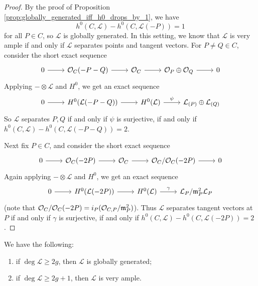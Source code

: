 \begin{proof}
  By the proof of Proposition
  \ref{prop:globally_generated_iff_h0_drops_by_1},
  we have
  \[
    h^0(C, \mathcal{L})
    - h^0(C, \mathcal{L}(-P))
    = 1
  \]
  for all $P \in C$, so
  $\mathcal{L}$ is globally generated.
  In this setting, we know that
  $\mathcal{L}$ is very ample if and only if
  $\mathcal{L}$ separates points and
  tangent vectors. For $P \ne Q \in C$,
  consider the short exact sequence
  \[
    \begin{tikzcd}
      0 \ar[r] & \OO_C(-P - Q)
      \ar[r] & \OO_C
      \ar[r] & \OO_P \oplus \OO_Q
      \ar[r] & 0
    \end{tikzcd}
  \]
  Applying $- \otimes \mathcal{L}$
  and $H^0$, we get an exact sequence
  \[
    \begin{tikzcd}
      0 \ar[r] & H^0(\mathcal{L}(-P - Q)) \ar[r] & H^0(\mathcal{L}) \ar[r, "\psi"]
               & \mathcal{L}_{(P)} \oplus \mathcal{L}_{(Q)}
    \end{tikzcd}
  \]
  So $\mathcal{L}$ separates $P, Q$ if and only
  if
  $\psi$ is surjective, if and only if
  $h^0(C, \mathcal{L})
    - h^0(C, \mathcal{L}(-P - Q)) = 2$.

  Next fix $P \in C$, and consider the
  short exact sequence
  \[
    \begin{tikzcd}
      0 \ar[r] & \OO_C(-2P)
      \ar[r] & \OO_C
      \ar[r] & \OO_C / \OO_C(-2P) \ar[r] & 0
    \end{tikzcd}
  \]
  Again applying
  $- \otimes \mathcal{L}$ and $H^0$, we
  get an exact sequence
  \[
    \begin{tikzcd}
      0 \ar[r] & H^0(\mathcal{L}(-2P))
      \ar[r] & H^0(\mathcal{L})
      \ar[r, "\gamma"] & \mathcal{L}_P / \m_P^2 \mathcal{L}_P
    \end{tikzcd}
  \]
  (note that
  $\mathcal{O}_C / \mathcal{O}_C(-2P) = i_P(\mathcal{O}_{C, P} / \mathfrak{m}_P^2)$).
  Thus $\mathcal{L}$ separates tangent
  vectors at $P$ if and only if
  $\gamma$ is surjective, if and only if
  $h^0(C, \mathcal{L})
    - h^0(C, \mathcal{L}(-2P)) = 2$.
\end{proof}

\begin{corollary}\label{cor:globally_generated_and_very_ample_if_degree_large_enough}
  We have the following:
  \begin{enumerate}
    \item if $\deg \mathcal{L} \ge 2g$, then
      $\mathcal{L}$ is globally generated;
    \item if $\deg \mathcal{L} \ge 2g + 1$,
      then $\mathcal{L}$ is very ample.
  \end{enumerate}
\end{corollary}

